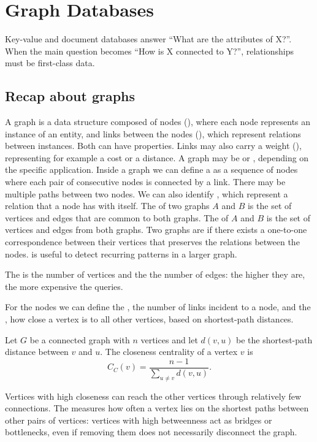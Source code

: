 \section{Graph Databases}\label{sec:graph}

Key-value and document databases answer ``What are the attributes of X?''. When the main question becomes ``How is X connected to Y?'', relationships must be first-class data.

\subsection{Recap about graphs}
A graph is a data structure composed of nodes (), where each node represents an instance of an entity, and links between the nodes (), which represent relations between instances. Both can have properties. Links may also carry a weight (), representing for example a cost or a distance. A graph may be  or , depending on the specific application. Inside a graph we can define a  as a sequence of nodes where each pair of consecutive nodes is connected by a link. There may be multiple paths between two nodes. We can also identify , which represent a relation that a node has with itself. The  of two graphs $A$ and $B$ is the set of vertices and edges that are common to both graphs. The  of $A$ and $B$ is the set of vertices and edges from both graphs. Two graphs are  if there exists a one-to-one correspondence between their vertices that preserves the relations between the nodes.  is useful to detect recurring patterns in a larger graph.

The  is the number of vertices and the  the number of edges: the higher they are, the more expensive the queries.

For the nodes we can define the , the number of links incident to a node, and the , how close a vertex is to all other vertices, based on shortest-path distances.

\begin{definition}
Let $G$ be a connected graph with $n$ vertices and let $d(v,u)$ be the shortest-path distance between $v$ and $u$. The closeness centrality of a vertex $v$ is
\[
C_C(v) = \frac{n-1}{\sum_{u \neq v} d(v,u)}.
\]
\end{definition}

Vertices with high closeness can reach the other vertices through relatively few connections. The  measures how often a vertex lies on the shortest paths between other pairs of vertices: vertices with high betweenness act as bridges or bottlenecks, even if removing them does not necessarily disconnect the graph.

